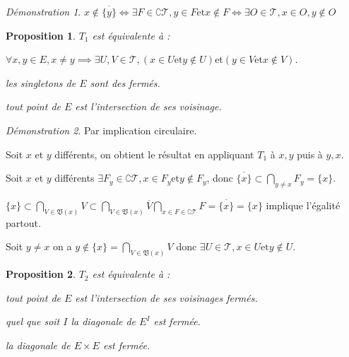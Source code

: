 \documentclass[a4paper, 11pt, french]{book}
\newenvironment{itemise}{\itemize}{\enditemize}
\theoremstyle{plain} %
\newtheorem{proposition}{Proposition}
\theoremstyle{definition} %
\theoremstyle{remark} %
\newtheorem*{demonstration}{Démonstration}
\newcommand{\1}{\mathds{1}}
\newcommand{\et}{\mathrel{\mathrm{et}}}
\renewcommand{\frak}[1]{\mathfrak{#1}}
\newcommand{\scr}[1]{\mathscr{#1}}
\begin{document}
\begin{demonstration}
	$x\notin\overline{\{y\}}
		\iff\exists F\in\complement\scr{T}, y\in F\et x\notin F
		\iff\exists O\in\scr{T}, x\in O, y\notin O$
\end{demonstration}

\begin{proposition}
	$T_1$ est équivalente à :
	\begin{itemise}
		\item $\forall x, y\in E, x\neq y\implies\exists U, V\in\scr{T}, (x\in U\et y\notin U)\et(y\in V\et x\notin V)$.
		\item les singletons de $E$ sont des fermés.
		\item tout point de $E$ est l'intersection de ses voisinage.
	\end{itemise}
\end{proposition}

\begin{demonstration}
	Par implication circulaire.
	\begin{itemise}
		\item Soit $x$ et $y$ différents, on obtient le résultat en appliquant $T_1$ à $x, y$ puis à $y, x$.
		\item Soit $x$ et $y$ différents $\exists F_y\in\complement\scr{T}, x\in F_y\et y\notin F_y$, donc $\overline{\{x\}}\subset\bigcap_{y\neq x}F_y=\{x\}$.
		\item $\{x\}\subset\bigcap_{V\in\frak{V}(x)}V\subset\bigcap_{V\in\frak{V}(x)}\overline{V}\bigcap_{x\in F\in\complement\scr{T}}F=\overline{\{x\}}=\{x\}$ implique l'égalité partout.
		\item Soit $y\neq x$ on a $y\notin\{x\}=\bigcap_{V\in\frak{V}(x)}V$ donc $\exists U\in\scr{T}, x\in U\et y\notin U$.
	\end{itemise}
\end{demonstration}

\begin{proposition}
	$T_2$ est équivalente à :
	\begin{itemise}
		\item tout point de $E$ est l'intersection de ses voisinages fermés.
		\item quel que soit $I$ la diagonale de $E^I$ est fermée.
		\item la diagonale de $E\times E$ est fermée.
	\end{itemise}
\end{proposition}
\end{document}

